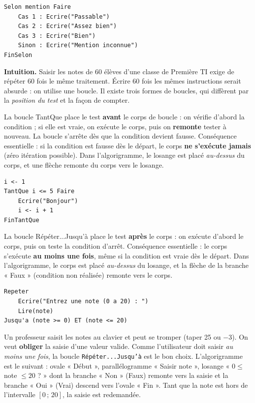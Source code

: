 \documentclass[11pt]{article}
\newcommand{\cle}[1]{{\popxbold\color{popdark}#1}}
\newcounter{popsec}
\newcounter{popsub}
\newcommand{\courssub}[1]{%
  \stepcounter{popsub}%
  \par\vspace{9pt}\noindent{\popxbold\fontsize{11.5}{13}\selectfont\color{popink}{\color{poporange}\thepopsec.\thepopsub}\hspace{6pt}#1}\par\nopagebreak\vspace{4pt}
}
\begin{document}
\begin{lstlisting}
Selon mention Faire
    Cas 1 : Ecrire("Passable")
    Cas 2 : Ecrire("Assez bien")
    Cas 3 : Ecrire("Bien")
    Sinon : Ecrire("Mention inconnue")
FinSelon
\end{lstlisting}

\courssub{Les structures répétitives (boucles)}

\textbf{Intuition.} Saisir les notes de 60 élèves d'une classe de Première TI exige de répéter 60 fois le même traitement. Écrire 60 fois les mêmes instructions serait absurde : on utilise une \cle{boucle}. Il existe trois formes de boucles, qui diffèrent par la \emph{position du test} et la façon de compter.

\begin{definition}
La boucle \cle{TantQue} place le test \textbf{avant} le corps de boucle : on vérifie d'abord la condition ; si elle est vraie, on exécute le corps, puis on \textbf{remonte} tester à nouveau. La boucle s'arrête dès que la condition devient fausse. Conséquence essentielle : si la condition est fausse dès le départ, le corps \textbf{ne s'exécute jamais} (zéro itération possible). Dans l'algorigramme, le losange est placé \emph{au-dessus} du corps, et une flèche remonte du corps vers le losange.
\end{definition}

\begin{lstlisting}
i <- 1
TantQue i <= 5 Faire
    Ecrire("Bonjour")
    i <- i + 1
FinTantQue
\end{lstlisting}

\begin{definition}
La boucle \cle{Répéter...Jusqu'à} place le test \textbf{après} le corps : on exécute d'abord le corps, puis on teste la condition d'arrêt. Conséquence essentielle : le corps s'exécute \textbf{au moins une fois}, même si la condition est vraie dès le départ. Dans l'algorigramme, le corps est placé \emph{au-dessus} du losange, et la flèche de la branche « Faux » (condition non réalisée) remonte vers le corps.
\end{definition}

\begin{lstlisting}
Repeter
    Ecrire("Entrez une note (0 a 20) : ")
    Lire(note)
Jusqu'a (note >= 0) ET (note <= 20)
\end{lstlisting}

\begin{exemplebox}
Un professeur saisit les notes au clavier et peut se tromper (taper 25 ou $-3$). On veut \textbf{obliger} la saisie d'une valeur valide. Comme l'utilisateur doit saisir \emph{au moins une fois}, la boucle \texttt{Répéter...Jusqu'à} est le bon choix. L'algorigramme est le suivant : ovale « Début », parallélogramme « Saisir note », losange « $0 \le$ note $\le 20$ ? » dont la branche « Non » (Faux) remonte vers la saisie et la branche « Oui » (Vrai) descend vers l'ovale « Fin ». Tant que la note est hors de l'intervalle $[0\,;\,20]$, la saisie est redemandée.
\end{exemplebox}
\end{document}
